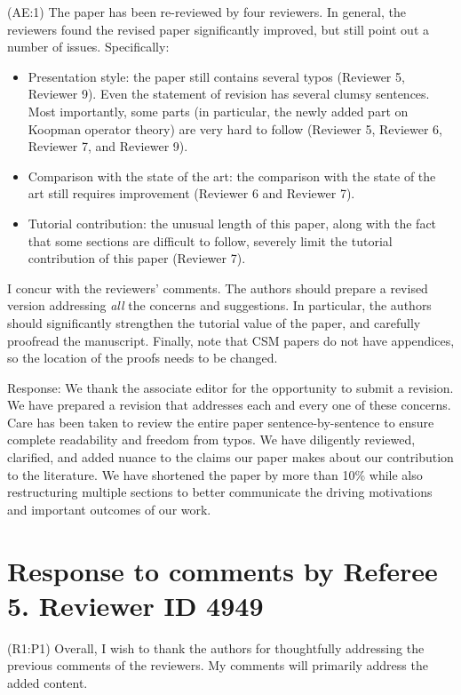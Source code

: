 \documentclass{letter}
\begin{document}
{\color{red}(AE:1)} The paper has been re-reviewed by four reviewers. In general, the reviewers found the revised paper significantly improved, but still point out a number of issues. Specifically:
\begin{itemize}
	\item Presentation style: the paper still contains several typos (Reviewer 5, Reviewer 9). Even the statement of revision has several clumsy sentences. Most importantly, some parts (in particular, the newly added	part on Koopman operator theory) are very hard to follow (Reviewer 5, Reviewer 6, Reviewer 7, and Reviewer 9).
	\item Comparison with the state of the art: the comparison with the state of the art still requires improvement (Reviewer 6 and Reviewer 7).
	\item Tutorial contribution: the unusual length of this paper, along with the fact that some sections are difficult to follow, severely limit the tutorial contribution of this paper (Reviewer 7).
\end{itemize}

I concur with the reviewers' comments. The authors should prepare a revised version addressing \emph{all} the concerns and suggestions. In particular, the authors should significantly strengthen the tutorial value of the paper, and carefully proofread the manuscript. Finally, note that CSM papers do not have appendices, so the location of the proofs needs to be changed.

{\color{red} Response:} We thank the associate editor for the opportunity to submit a revision.  We have prepared a revision that addresses each and every one of these concerns. Care has been taken to review the entire paper sentence-by-sentence to ensure complete readability and freedom from typos. We have diligently reviewed, clarified, and added nuance to the claims our paper makes about our contribution to the literature. We have shortened the paper by more than 10\% while also restructuring multiple sections to better communicate the driving motivations and important outcomes of our work.


\section{Response to comments by Referee 5. Reviewer ID 4949}

{\color{red}(R1:P1)} Overall, I wish to thank the authors for thoughtfully addressing the previous comments of the reviewers. My comments will primarily address the added content. 
\end{document}
